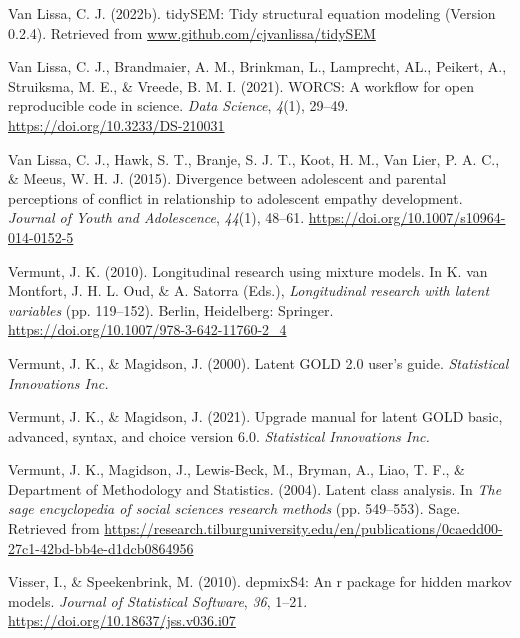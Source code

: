 \documentclass[
  ,man,floatsintext]{apa6}
\newlength{\cslhangindent}
\newlength{\cslentryspacingunit} %
\newenvironment{CSLReferences}[2] %
 {%
  \setlength{\parindent}{0pt}
  \ifodd #1
  \let\oldpar\par
  \def\par{\hangindent=\cslhangindent\oldpar}
  \fi
  \setlength{\parskip}{#2\cslentryspacingunit}
 }%
 {}
\begin{document}
\begin{CSLReferences}{1}{0}
\leavevmode{}%
Van Lissa, C. J. (2022b). {tidySEM}: Tidy structural equation modeling (Version 0.2.4). Retrieved from \href{https://www.github.com/cjvanlissa/tidySEM}{www.github.com/cjvanlissa/tidySEM}

\leavevmode{}%
Van Lissa, C. J., Brandmaier, A. M., Brinkman, L., Lamprecht, AL., Peikert, A., Struiksma, M. E., \& Vreede, B. M. I. (2021). {WORCS}: A workflow for open reproducible code in science. \emph{Data Science}, \emph{4}(1), 29--49. \url{https://doi.org/10.3233/DS-210031}

\leavevmode{}%
Van Lissa, C. J., Hawk, S. T., Branje, S. J. T., Koot, H. M., Van Lier, P. A. C., \& Meeus, W. H. J. (2015). Divergence between adolescent and parental perceptions of conflict in relationship to adolescent empathy development. \emph{Journal of Youth and Adolescence}, \emph{44}(1), 48--61. \url{https://doi.org/10.1007/s10964-014-0152-5}

\leavevmode{}%
Vermunt, J. K. (2010). Longitudinal research using mixture models. In K. van Montfort, J. H. L. Oud, \& A. Satorra (Eds.), \emph{Longitudinal research with latent variables} (pp. 119--152). Berlin, Heidelberg: Springer. \url{https://doi.org/10.1007/978-3-642-11760-2_4}

\leavevmode{}%
Vermunt, J. K., \& Magidson, J. (2000). Latent {GOLD} 2.0 user's guide. \emph{Statistical Innovations Inc.}

\leavevmode{}%
Vermunt, J. K., \& Magidson, J. (2021). Upgrade manual for latent {GOLD} basic, advanced, syntax, and choice version 6.0. \emph{Statistical Innovations Inc.}

\leavevmode{}%
Vermunt, J. K., Magidson, J., Lewis-Beck, M., Bryman, A., Liao, T. F., \& Department of Methodology and Statistics. (2004). Latent class analysis. In \emph{The sage encyclopedia of social sciences research methods} (pp. 549--553). Sage. Retrieved from \url{https://research.tilburguniversity.edu/en/publications/0caedd00-27c1-42bd-bb4e-d1dcb0864956}

\leavevmode{}%
Visser, I., \& Speekenbrink, M. (2010). {depmixS}4: An r package for hidden markov models. \emph{Journal of Statistical Software}, \emph{36}, 1--21. \url{https://doi.org/10.18637/jss.v036.i07}


\end{CSLReferences}
\end{document}
